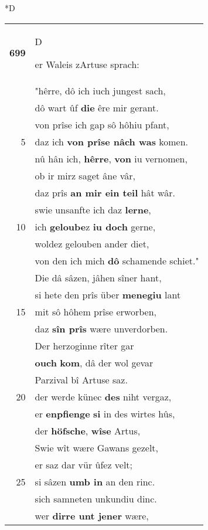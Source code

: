 \documentclass[8pt,a4paper,notitlepage]{article}
\begin{document}
\begin{table}[ht]
\begin{minipage}[t]{0.5\linewidth}
\small
\begin{center}*D
\end{center}
\begin{tabular}{rl}
\textbf{699} & \begin{large}D\end{large}er Waleis zArtuse sprach:\\ 
 & "hêrre, dô ich iuch jungest sach,\\ 
 & dô wart ûf \textbf{die} êre mir gerant.\\ 
 & von prîse ich gap sô hôhiu pfant,\\ 
5 & daz ich \textbf{von prîse nâch was} komen.\\ 
 & nû hân ich, \textbf{hêrre}, \textbf{von} iu vernomen,\\ 
 & ob ir mirz saget âne vâr,\\ 
 & daz prîs \textbf{an mir ein teil} hât wâr.\\ 
 & swie unsanfte ich daz \textbf{lerne},\\ 
10 & ich \textbf{geloube}z \textbf{iu doch} gerne,\\ 
 & woldez gelouben ander diet,\\ 
 & von den ich mich \textbf{dô} schamende schiet."\\ 
 & Die dâ sâzen, jâhen sîner hant,\\ 
 & si hete den prîs über \textbf{menegiu} lant\\ 
15 & mit sô hôhem prîse erworben,\\ 
 & daz \textbf{sîn prîs} wære unverdorben.\\ 
 & Der herzoginne rîter gar\\ 
 & \textbf{ouch} \textbf{kom}, dâ der wol gevar\\ 
 & Parzival bî Artuse saz.\\ 
20 & der werde künec \textbf{des} niht vergaz,\\ 
 & er \textbf{enpfienge} \textbf{si} in des wirtes hûs,\\ 
 & der \textbf{höfsche}, \textbf{wîse} Artus,\\ 
 & Swie wît wære Gawans gezelt,\\ 
 & er saz dar vür ûfez velt;\\ 
25 & si sâzen \textbf{umb in} an den rinc.\\ 
 & sich samneten unkundiu dinc.\\ 
 & wer \textbf{dirre unt jener} wære,\\ 

\end{tabular}
\end{minipage}
\end{table}
\end{document}
